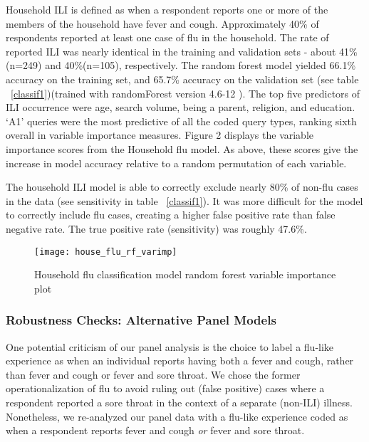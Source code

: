 \documentclass[12pt]{article}
\begin{document}
Household ILI is defined as when a respondent reports one or more of the members of the household have fever and cough. Approximately 40\% of respondents reported at least one case of flu in the household. The rate of reported ILI was nearly identical in the training and validation sets - about 41\% (n=249) and 40\%(n=105), respectively. The random forest model yielded 66.1\% accuracy on the training set, and 65.7\% accuracy on the validation set (see table ~\ref{classif1})(trained with randomForest version 4.6-12 \citep{liaw_and_wiener_2002}). The top five predictors of ILI occurrence were age, search volume, being a parent, religion, and education. `A1' queries were the most predictive of all the coded query types, ranking sixth overall in variable importance measures. Figure 2 displays the variable importance scores from the Household flu model. As above, these scores give the increase in model accuracy relative to a random permutation of each variable. 

The household ILI model is able to correctly exclude nearly 80\% of non-flu cases in the data (see sensitivity in table ~\ref{classif1}). It was more difficult for the model to correctly include flu cases, creating a higher false positive rate than false negative rate. The true positive rate (sensitivity) was roughly 47.6\%. 


\begin{figure}[!htbp]
\begin{centering}
   \texttt{[image: house\_flu\_rf\_varimp]}
  \caption{Household flu classification model random forest variable importance plot}
\label{house_rf}
\end{centering}
\end{figure}

\clearpage

\subsubsection{Robustness Checks: Alternative Panel Models}

One potential criticism of our panel analysis is the choice to label a flu-like experience as when an individual reports having both a fever and cough, rather than fever and cough or fever and sore throat. We chose the former operationalization of flu to avoid ruling out (false positive) cases where a respondent reported a sore throat in the context of a separate (non-ILI) illness. Nonetheless, we re-analyzed our panel data with a flu-like experience coded as when a respondent reports fever and cough \emph{or} fever and sore throat. 
\end{document}
